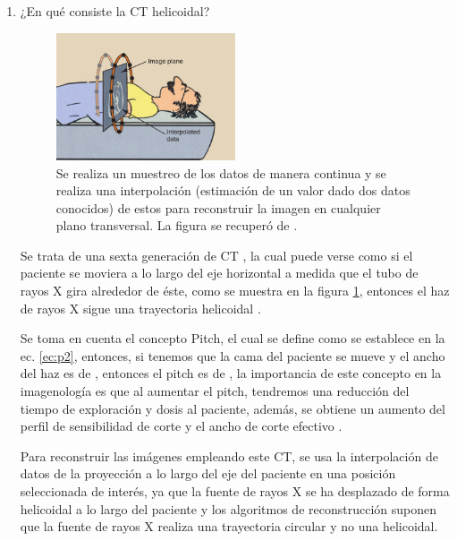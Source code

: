 \begin{enumerate}[1.]
\item  ¿En qué consiste la CT helicoidal?


\begin{figure}[!ht]
  \centering
  \includegraphics[width=0.5\textwidth]{./figuras/p2_ct.png}
  \caption{Se realiza un muestreo de los datos de manera continua y se realiza una interpolación (estimación de un valor dado dos datos conocidos) de estos para reconstruir la imagen en cualquier plano transversal. La figura se recuperó de \citep{stewart}.}
  \label{p2:ct}
  \end{figure}

Se trata de una sexta generación de CT \citep{IM}, la cual puede verse como si el paciente se moviera a lo largo del eje horizontal a medida que el tubo de rayos X gira alrededor de éste, como se muestra en la figura \ref{p2:ct}, entonces el haz de rayos X sigue una trayectoria helicoidal \citep{stewart}. 

Se toma en cuenta el concepto Pitch, el cual se define como se establece en la ec. \ref{ec:p2}, entonces, si tenemos que la cama del paciente se mueve  y el ancho del haz es de , entonces el pitch es de , la importancia de este concepto en la imagenología es que al aumentar el pitch, tendremos una reducción del tiempo de exploración y dosis al paciente, además, se obtiene un aumento del perfil de sensibilidad de corte y el ancho de corte efectivo \citep{stewart,jerro}.




Para reconstruir las imágenes empleando este CT, se usa la interpolación de datos de la proyección a lo largo del eje del paciente en una posición seleccionada de interés, ya que la fuente de rayos X se ha desplazado de forma helicoidal a lo largo del paciente  y los algoritmos de reconstrucción suponen que la fuente de rayos X realiza una trayectoria circular y no una helicoidal.










\end{enumerate}
